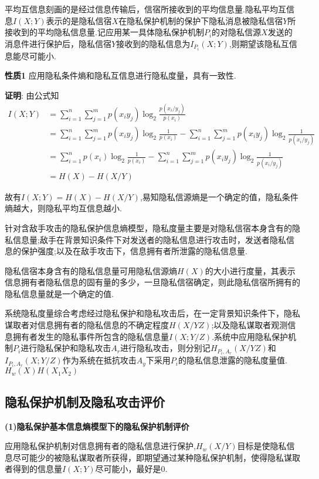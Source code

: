 平均互信息刻画的是经过信息传输后，信宿所接收到的平均信息量.隐私平均互信息$I(X;Y)$表示的是隐私信宿$X$在隐私保护机制的保护下隐私消息被隐私信宿$Y$所接收到的平均隐私信息量.记应用某一具体隐私保护机制$P_{i}$的对隐私信源$X$发送的消息件进行保护后，隐私信宿$Y$接收到的隐私信息为$I_{P_{i}}(X;Y)$,则期望该隐私互信息能尽可能小.

\textbf{性质1} 应用隐私条件熵和隐私互信息进行隐私度量，具有一致性.

\textbf{证明}: 由公式知
\begin{equation}
\begin{split}
I(X;Y)&=\sum_{i=1}^{n}\sum_{j=1}^{m}p(x_{i}y_{j})\log_{2}\frac{p(x_{i}/y_{j})}{p(x_{i})}\\
&=\sum_{i=1}^{n}\sum_{j=1}^{m}p(x_{i}y_{j})\log_{2}\frac{1}{p(x_{i})}-\sum_{i=1}^{n}\sum_{j=1}^{m}p(x_{i}y_{j})\log_{2}\frac{1}{p(x_{i}/y_{j})}\\
&=\sum_{i=1}^{n}p(x_{i})\log_{2}\frac{1}{p(x_{i})}-\sum_{i=1}^{n}\sum_{j=1}^{m}p(x_{i}y_{j})\log_{2}\frac{1}{p(x_{i}/y_{j})}\\
&=H(X)-H(X/Y)
\end{split}
\end{equation}

故有$I(X;Y)=H(X)-H(X/Y)$,易知隐私信源熵是一个确定的值，隐私条件熵越大，则隐私平均互信息越小.

针对含敌手攻击的隐私保护信息熵模型，隐私度量主要是对隐私信宿本身含有的隐私信息量;敌手在背景知识条件下对发送者的隐私信息进行攻击时，发送者隐私信息的保护强度;以及在敌手攻击下，信息拥有者所泄露的隐私信息量.

隐私信宿本身含有的隐私信息量可用隐私信源熵$H(X)$的大小进行度量，其表示信息拥有者隐私信息的固有量的多少，一旦隐私信宿确定，则此隐私信宿所拥有的隐私信息量就是一个确定的值.

系统隐私度量综合考虑经过隐私保护和隐私攻击后，在一定背景知识条件下，隐私谋取者对信息拥有者的隐私信息的不确定程度$H(X/YZ)$;以及隐私谋取者观测信息拥有者发生的隐私事件所包含的隐私信息量$I(X;Y/Z)$.系统中应用隐私保护机制$P_{i}$进行隐私保护和隐私攻击$A_{r}$进行隐私攻击，则分别记$H_{P_{i},A_{r}}(X/YZ)$和$I_{P_{i},A_{r}}(X;Y/Z)$作为系统在抵抗攻击$A_{y}$下采用$P_{i}$的隐私信息泄露的隐私度量值.$H_{w}(X)H(X_{1}X_{2})$

\subsection{隐私保护机制及隐私攻击评价}
\textbf{(1)隐私保护基本信息熵模型下的隐私保护机制评价}

应用隐私保护机制对信息拥有者的隐私信息进行保护,$H_{w}(X/Y)$目标是使隐私信息尽可能少的被隐私谋取者所获得，即期望通过某种隐私保护机制，使得隐私谋取者得到的信息量$I(X;Y)$尽可能小，最好是0.

